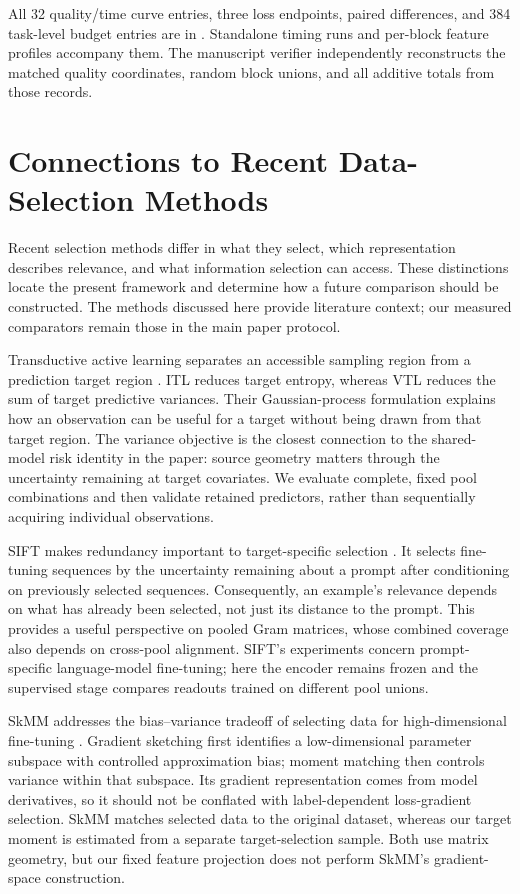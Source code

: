 \documentclass{article}
\begin{document}
All 32 quality/time curve entries, three loss endpoints, paired differences, and 384 task-level budget entries are in . Standalone timing runs and per-block feature profiles accompany them. The manuscript verifier independently reconstructs the matched quality coordinates, random block unions, and all additive totals from those records.

\section{Connections to Recent Data-Selection Methods}
\label{app:related-selection}
Recent selection methods differ in what they select, which representation describes relevance, and what information selection can access. These distinctions locate the present framework and determine how a future comparison should be constructed. The methods discussed here provide literature context; our measured comparators remain those in the main paper protocol.

Transductive active learning separates an accessible sampling region from a prediction target region \citep{hubotter2024transductive}. ITL reduces target entropy, whereas VTL reduces the sum of target predictive variances. Their Gaussian-process formulation explains how an observation can be useful for a target without being drawn from that target region. The variance objective is the closest connection to the shared-model risk identity in the paper: source geometry matters through the uncertainty remaining at target covariates. We evaluate complete, fixed pool combinations and then validate retained predictors, rather than sequentially acquiring individual observations.

SIFT makes redundancy important to target-specific selection \citep{hubotter2025sift}. It selects fine-tuning sequences by the uncertainty remaining about a prompt after conditioning on previously selected sequences. Consequently, an example's relevance depends on what has already been selected, not just its distance to the prompt. This provides a useful perspective on pooled Gram matrices, whose combined coverage also depends on cross-pool alignment. SIFT's experiments concern prompt-specific language-model fine-tuning; here the encoder remains frozen and the supervised stage compares readouts trained on different pool unions.

SkMM addresses the bias--variance tradeoff of selecting data for high-dimensional fine-tuning \citep{dong2024skmm}. Gradient sketching first identifies a low-dimensional parameter subspace with controlled approximation bias; moment matching then controls variance within that subspace. Its gradient representation comes from model derivatives, so it should not be conflated with label-dependent loss-gradient selection. SkMM matches selected data to the original dataset, whereas our target moment is estimated from a separate target-selection sample. Both use matrix geometry, but our fixed feature projection does not perform SkMM's gradient-space construction.
\end{document}
